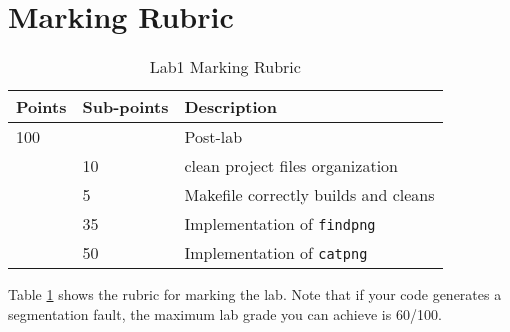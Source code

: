 \section{Marking Rubric}
\begin{table}[ht]
\begin{center}
\begin{tabular}{|p{2cm}|p{2cm}|p{9cm}|}
\hline
Points & Sub-points &Description  \\ \hline
100     &        & Post-lab \\ \hline
        & 10     & clean project files organization \\ \hline
        &  5     & Makefile correctly builds and cleans \\ \hline
        & 35     & Implementation of \verb+findpng+  \\ \hline
        & 50     & Implementation of \verb+catpng+ \\ \hline
\end{tabular}
\caption{Lab1 Marking Rubric}
\label{tb_lab1_rubric}
\end{center}
\end{table}

Table \ref{tb_lab1_rubric} shows the rubric for marking the lab. Note that if your code generates a segmentation fault, the maximum lab grade you can achieve is 60/100.

